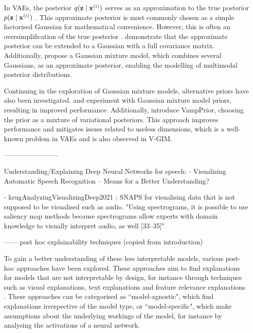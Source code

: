 	In VAEs, the posterior $q (\mathbf{z} \mid \mathbf{x}^{(i)})$ serves as an approximation to the true posterior $p (\mathbf{z} \mid \mathbf{x}^{(i)})$ \citep{odaiboTutorialDerivingStandard2019}. This approximate posterior is most commonly chosen as a simple factorised Gaussian for mathematical convenience. However, this is often an oversimplification of the true posterior \citep{nalisnickApproximateInferenceDeep2016a}. \cite{kingmaIntroductionVariationalAutoencoders2019} demonstrate that the approximate posterior can be extended to a Gaussian with a full covariance matrix. Additionally, \cite{nalisnickApproximateInferenceDeep2016} propose a Gaussian mixture model, which combines several Gaussians, as an approximate posterior, enabling the modelling of multimodal posterior distributions.
	
	Continuing in the exploration of Gaussian mixture models, alternative priors have also been investigated. \cite{guoVariationalAutoencoderOptimizing2020} and \cite{leeMetaGMVAEMixtureGaussian2021} experiment with Gaussian mixture model priors, resulting in improved performance. Additionally, \cite{tomczakVAEVampPrior2018} introduce VampPrior, choosing the prior as a mixture of variational posteriors. This approach improves performance and mitigates issues related to useless dimensions, which is a well-known problem in VAEs and is also observed in V-GIM.
	

------------------------

Understanding/Explaining Deep Neural Networks for speech:
- Visualizing Automatic Speech Recognition – Means for a Better Understanding? \citep{markertVisualizingAutomaticSpeech2021} %

- krugAnalyzingVisualizingDeep2021 : SNAPS for visualising data that is not supposed to be visualised such as audio.
	"Using spectrograms, it is possible to use saliency map methods because spectrograms allow experts with domain knowledge to visually interpret audio, as well [33–35]" %


------ post hoc explainability techniques (copied from introduction)

To gain a better understanding of these less interpretable models, various post-hoc approaches have been explored. These approaches aim to find explanations for models that are not interpretable by design, for instance through techniques such as visual explanations, text explanations and feature relevance explanations \citep{barredoarrietaExplainableArtificialIntelligence2020a}. These approaches can be categorised as ``model-agnostic", which find explanations irrespective of the model type, or ``model-specific", which make assumptions about the underlying workings of the model, for instance by analysing the activations of a neural network.

